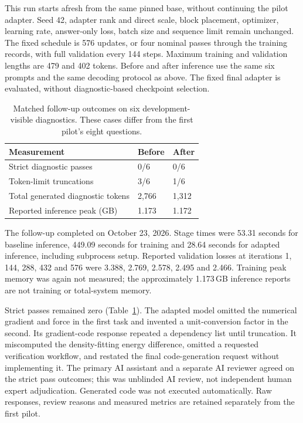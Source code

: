 \documentclass[11pt]{article}
\begin{document}
This run starts afresh from the same pinned base, without continuing the
pilot adapter. Seed 42, adapter rank and direct scale, block placement,
optimizer, learning rate, answer-only loss, batch size and sequence limit
remain unchanged. The fixed schedule is 576 updates, or four nominal passes
through the training records, with full validation every 144 steps. Maximum
training and validation lengths are 479 and 402 tokens. Before and after
inference use the same six prompts and the same decoding protocol as above.
The fixed final adapter is evaluated, without diagnostic-based checkpoint
selection.

\begin{table}[ht]
\centering
\caption{Matched follow-up outcomes on six development-visible diagnostics.
These cases differ from the first pilot's eight questions.}
\label{tab:followup}
\begin{tabular}{lll}
\toprule
Measurement & Before & After \\
\midrule
Strict diagnostic passes & 0/6 & 0/6 \\
Token-limit truncations & 3/6 & 1/6 \\
Total generated diagnostic tokens & 2,766 & 1,312 \\
Reported inference peak (GB) & 1.173 & 1.172 \\
\bottomrule
\end{tabular}
\end{table}

The follow-up completed on October 23, 2026. Stage times were 53.31 seconds
for baseline inference, 449.09 seconds for training and 28.64 seconds for
adapted inference, including subprocess setup. Reported validation losses
at iterations 1, 144, 288, 432 and 576 were 3.388, 2.769, 2.578, 2.495 and
2.466. Training peak memory was again not measured; the approximately
1.173\,GB inference reports are not training or total-system memory.

Strict passes remained zero (Table~\ref{tab:followup}). The adapted model
omitted the numerical gradient and force in the first task and invented a
unit-conversion factor in the second. Its gradient-code response repeated
a dependency list until truncation. It miscomputed the density-fitting
energy difference, omitted a requested verification workflow, and restated
the final code-generation request without implementing it. The primary AI
assistant and a separate AI reviewer agreed on the strict pass outcomes;
this was unblinded AI review, not independent human expert adjudication.
Generated code was not executed automatically. Raw responses, review reasons
and measured metrics are retained separately from the first pilot.
\end{document}
